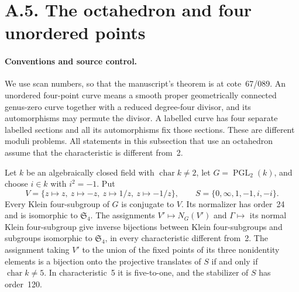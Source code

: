 \section{A.5. The octahedron and four unordered points}

\paragraph{Conventions and source control.}
We use scan numbers, so that the manuscript's theorem is at cote~67/089.
An unordered four-point curve means a smooth proper geometrically connected
genus-zero curve together with a reduced degree-four divisor, and its
automorphisms may permute the divisor. A labelled curve has four separate
labelled sections and all its automorphisms fix those sections. These are
different moduli problems. All statements in this subsection that use an
octahedron assume that the characteristic is different from~2.

\begin{proposition}
\label{A:octahedron}
Let $k$ be an algebraically closed field with $\operatorname{char}k\ne2$,
let $G=\operatorname{PGL}_2(k)$, and choose $i\in k$ with $i^2=-1$.
Put
\[
 V=\{z\mapsto z,\ z\mapsto-z,\ z\mapsto1/z,\ z\mapsto-1/z\},
 \qquad S=\{0,\infty,1,-1,i,-i\}.
\]
Every Klein four-subgroup of $G$ is conjugate to $V$. Its normalizer has
order~24 and is isomorphic to $\mathfrak S_4$. The assignments
$V'\mapsto N_G(V')$ and $\Gamma\mapsto$ its normal Klein four-subgroup
give inverse bijections between Klein four-subgroups and subgroups
isomorphic to $\mathfrak S_4$, in every characteristic different from~2.
The assignment taking $V'$ to the union of the fixed points of its three
nonidentity elements is a bijection onto the projective translates of
$S$ if and only if $\operatorname{char}k\ne5$. In characteristic~5 it is
five-to-one, and the stabilizer of $S$ has order~120.
\end{proposition}

